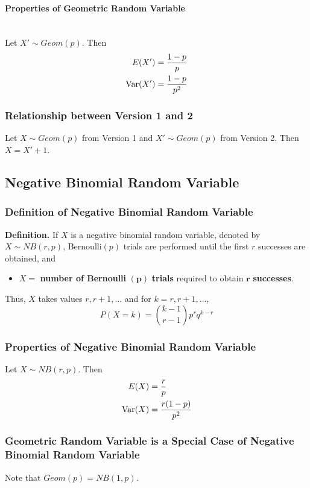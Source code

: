 \documentclass[../st2131_notes.tex]{subfiles}
\begin{document}
\paragraph{Properties of Geometric Random Variable}\,\\
Let \(X'\sim Geom(p)\). Then
\begin{align*}
	E(X')&=\frac{1-p}{p} \\
	\operatorname{Var}(X')&=\frac{1-p}{p^2}
\end{align*}

\subsubsection{Relationship between Version 1 and 2}
Let \(X\sim Geom(p)\) from Version 1 and \(X'\sim Geom(p)\) from Version 2. Then \(X=X'+1\).

\subsection{Negative Binomial Random Variable}
\subsubsection{Definition of Negative Binomial Random Variable}
\textbf{Definition.} If \(X\) is a negative binomial random variable, denoted by \(X\sim NB(r,p)\), Bernoulli\((p)\) trials are performed until the first \(r\) successes are obtained, and
\begin{itemize}
	\item\(X=\) \textbf{number of Bernoulli} \(\pmb{(p)}\) \textbf{trials} required to obtain \(\pmb{r}\) \textbf{successes}.
\end{itemize}
Thus, \(X\) takes values \(r,r+1,\ldots\) and for \(k=r,r+1,\ldots\),
\[P(X=k)=\binom{k-1}{r-1}p^rq^{k-r}\]

\subsubsection{Properties of Negative Binomial Random Variable}
Let \(X\sim NB(r,p)\). Then
\begin{align*}
	E(X)&=\frac{r}{p} \\
	\operatorname{Var}(X)&=\frac{r(1-p)}{p^2}
\end{align*}

\subsubsection{Geometric Random Variable is a Special Case of Negative Binomial Random Variable}
Note that \(Geom(p)=NB(1,p)\).
\end{document}
